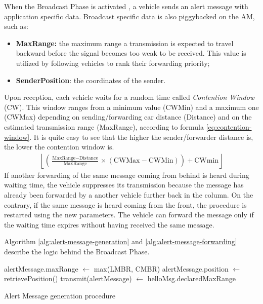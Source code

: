 		
		When the Broadcast Phase is activated , a vehicle sends an alert message with application specific data. Broadcast specific data is also piggybacked on the AM, such as:
		\begin{itemize}
			\item \textbf{MaxRange:} the maximum range a transmission is expected to travel backward before the signal becomes too weak to be received. This value is utilized by following vehicles to rank their forwarding priority;
			\item \textbf{SenderPosition}: the coordinates of the sender.
		\end{itemize}
		Upon reception, each vehicle waits for a random time called \textit{Contention Window} (CW). This window ranges from a minimum value (CWMin) and a maximum one (CWMax) depending on sending/forwarding car distance (Distance) and on the estimated transmission range (MaxRange), according to formula \ref{eq:contention-window}. It is quite easy to see that the higher the sender/forwarder distance is, the lower the contention window is.
		\begin{gather}
			\left\lfloor \left( \frac{\text{MaxRange} - \text{Distance}}{\text{MaxRange}} \times (\text{CWMax} - \text{CWMin}) \right) + \text{CWmin}  \right\rfloor
			\label{eq:contention-window}
		\end{gather}
		If another forwarding of the same message coming from behind is heard during waiting time, the vehicle suppresses its transmission because the message has already been forwarded by a another vehicle further back in the column. On the contrary, if the same message is heard coming from the front, the procedure is restarted using the new parameters. The vehicle can forward the message only if the waiting time expires without having received the same message.
		
		Algorithm \ref{alg:alert-message-generation} and \ref{alg:alert-message-forwarding} describe the logic behind the Broadcast Phase.
		
		\begin{algorithm}[H]
			\begin{algorithmic}[1]
				\State alertMessage.maxRange $\gets$ max(LMBR, CMBR)
				\State alertMessage.position $\gets$ retrievePosition()
				\State transmit(alertMessage) $\gets$ helloMsg.declaredMaxRange
			\end{algorithmic}
			\caption{Alert Message generation procedure}
			\label{alg:alert-message-generation}
		\end{algorithm}
	
